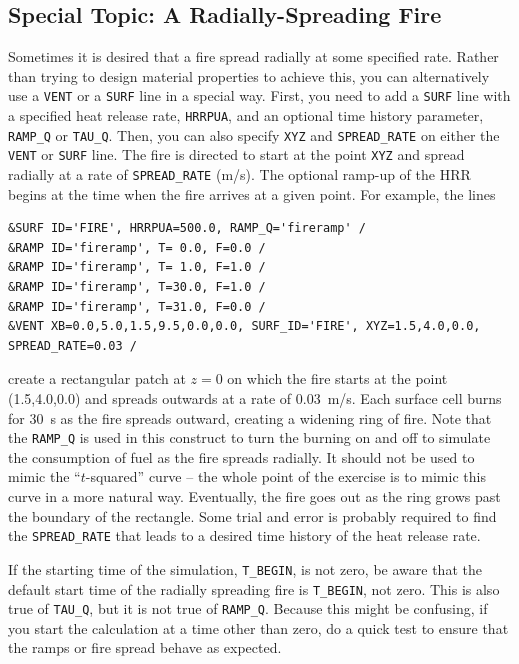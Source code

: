 \documentclass[11pt]{book}
\newcommand{\ct}{\tt\small}
\begin{document}
\subsection{Special Topic: A Radially-Spreading Fire}
\label{info:spread}

Sometimes it is desired that a fire spread radially at some specified
rate. Rather than trying to design material properties
to achieve this, you can alternatively use a {\ct VENT} or a {\ct SURF} line in a special way.
First, you need to add a {\ct SURF} line with
a specified heat release rate, {\ct HRRPUA}, and an optional
time history parameter, {\ct RAMP\_Q} or {\ct TAU\_Q}. Then, you can also specify {\ct XYZ} and {\ct SPREAD\_RATE} on either the {\ct VENT} or {\ct SURF} line.
The fire is directed to start at the point {\ct XYZ} and spread
radially at a rate of {\ct SPREAD\_RATE} (m/s). The optional ramp-up of the HRR begins at
the time when the fire arrives at a given point.
For example, the lines

\footnotesize
\begin{verbatim}
&SURF ID='FIRE', HRRPUA=500.0, RAMP_Q='fireramp' /
&RAMP ID='fireramp', T= 0.0, F=0.0 /
&RAMP ID='fireramp', T= 1.0, F=1.0 /
&RAMP ID='fireramp', T=30.0, F=1.0 /
&RAMP ID='fireramp', T=31.0, F=0.0 /
&VENT XB=0.0,5.0,1.5,9.5,0.0,0.0, SURF_ID='FIRE', XYZ=1.5,4.0,0.0, SPREAD_RATE=0.03 /
\end{verbatim}
\normalsize

\noindent
create a rectangular patch at $z=0$ on which the fire starts at the
point (1.5,4.0,0.0) and spreads outwards at a rate of 0.03~m/s. Each surface cell
burns for 30~s as the fire spreads outward, creating a widening ring of fire. Note that the {\ct RAMP\_Q} is used in this
construct to turn the burning on and off to simulate the consumption of fuel as the fire spreads radially. It should not
be used to mimic the ``$t$-squared'' curve -- the whole point of the exercise is to mimic this curve in a more natural way.
Eventually, the fire goes out as the ring grows past the boundary of the rectangle.
Some trial and error is probably required to find the {\ct SPREAD\_RATE} that
leads to a desired time history of the heat release rate.

\begin{warning}
If the starting time of the simulation, {\ct T\_BEGIN}, is not zero, be aware that the default start time of the radially spreading
fire is {\ct T\_BEGIN}, not zero. This is also true of {\ct TAU\_Q}, but it is not true of {\ct RAMP\_Q}. Because this might be
confusing, if you start the calculation at a time other than zero, do a quick test to ensure that the ramps or fire spread behave as
expected.
\end{warning}
\end{document}
